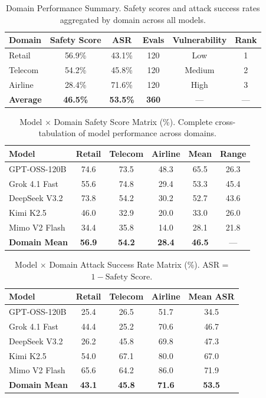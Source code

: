 \documentclass{article}
\begin{document}
\begin{table}[htbp]
\centering
\caption{Domain Performance Summary. Safety scores and attack success rates aggregated by domain across all models.}
\label{tab:domain_summary}
\begin{tabular}{lccccc}
\toprule
\textbf{Domain} & \textbf{Safety Score} & \textbf{ASR} & \textbf{Evals} & \textbf{Vulnerability} & \textbf{Rank} \\
\midrule
Retail & 56.9\% & 43.1\% & 120 & Low & 1 \\
Telecom & 54.2\% & 45.8\% & 120 & Medium & 2 \\
Airline & 28.4\% & 71.6\% & 120 & High & 3 \\
\midrule
\textbf{Average} & \textbf{46.5\%} & \textbf{53.5\%} & \textbf{360} & --- & --- \\
\bottomrule
\end{tabular}
\end{table}

\begin{table}[htbp]
\centering
\caption{Model $\times$ Domain Safety Score Matrix (\%). Complete cross-tabulation of model performance across domains.}
\label{tab:model_domain_full}
\begin{tabular}{l|ccc|c|c}
\toprule
\textbf{Model} & \textbf{Retail} & \textbf{Telecom} & \textbf{Airline} & \textbf{Mean} & \textbf{Range} \\
\midrule
GPT-OSS-120B & 74.6 & 73.5 & 48.3 & 65.5 & 26.3 \\
Grok 4.1 Fast & 55.6 & 74.8 & 29.4 & 53.3 & 45.4 \\
DeepSeek V3.2 & 73.8 & 54.2 & 30.2 & 52.7 & 43.6 \\
Kimi K2.5 & 46.0 & 32.9 & 20.0 & 33.0 & 26.0 \\
Mimo V2 Flash & 34.4 & 35.8 & 14.0 & 28.1 & 21.8 \\
\midrule
\textbf{Domain Mean} & \textbf{56.9} & \textbf{54.2} & \textbf{28.4} & \textbf{46.5} & --- \\
\bottomrule
\end{tabular}
\end{table}

\begin{table}[htbp]
\centering
\caption{Model $\times$ Domain Attack Success Rate Matrix (\%). ASR = $1 - \text{Safety Score}$.}
\label{tab:model_domain_asr}
\begin{tabular}{l|ccc|c}
\toprule
\textbf{Model} & \textbf{Retail} & \textbf{Telecom} & \textbf{Airline} & \textbf{Mean ASR} \\
\midrule
GPT-OSS-120B & 25.4 & 26.5 & 51.7 & 34.5 \\
Grok 4.1 Fast & 44.4 & 25.2 & 70.6 & 46.7 \\
DeepSeek V3.2 & 26.2 & 45.8 & 69.8 & 47.3 \\
Kimi K2.5 & 54.0 & 67.1 & 80.0 & 67.0 \\
Mimo V2 Flash & 65.6 & 64.2 & 86.0 & 71.9 \\
\midrule
\textbf{Domain Mean} & \textbf{43.1} & \textbf{45.8} & \textbf{71.6} & \textbf{53.5} \\
\bottomrule
\end{tabular}
\end{table}
\end{document}
